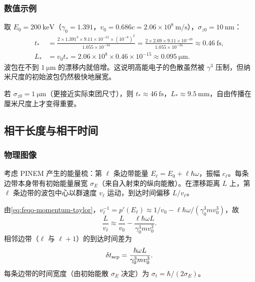 \subsubsection{数值示例}

取 $E_0=200\ \si{\kilo\electronvolt}$（$\gamma_0=1.391$，$v_0=0.686c=2.06\times10^8\ \si{\metre\per\second}$），$\sigma_{z0}=10\ \si{\nano\metre}$：
\begin{align}
t_*&=\frac{2\times1.391^3\times9.11\times10^{-31}\times(10^{-8})^2}{1.055\times10^{-34}}
=\frac{2\times2.69\times9.11\times10^{-49}}{1.055\times10^{-34}}
\approx 0.46\ \si{\femto\second},\\
L_*&=v_0 t_*=2.06\times10^8\times0.46\times10^{-15}\approx 0.095\ \si{\micro\metre}.
\end{align}
波包在不到 $1\ \si{\micro\metre}$ 的漂移内就倍增。这说明高能电子的色散虽然被 $\gamma^3$ 压制，但纳米尺度的初始波包仍然极快地展宽。

若 $\sigma_{z0}=1\ \si{\micro\metre}$（更接近实际束团尺寸），则 $t_*\approx 46\ \si{\femto\second}$，$L_*\approx 9.5\ \si{\milli\metre}$，自由传播在厘米尺度上才变得重要。

\subsection{相干长度与相干时间}

\subsubsection{物理图像}

考虑 PINEM 产生的能量梳：第 $\ell$ 条边带能量 $E_\ell=E_0+\ell\hbar\omega$，振幅 $c_\ell$。每条边带本身带有初始能量展宽 $\sigma_E$（来自入射束的纵向能散）。在漂移距离 $L$ 上，第 $\ell$ 条边带的波包中心以群速度 $v_\ell$ 运动，到达时间偏移 $L/v_\ell$。

由\cref{eq:feqo-momentum-taylor}，$v_\ell^{-1}=p'(E_\ell)\approx 1/v_0-\ell\hbar\omega/(\gamma_0^3mv_0^3)$，故
\begin{equation}
\frac{L}{v_\ell}\approx\frac{L}{v_0}-\frac{\ell\hbar\omega L}{\gamma_0^3mv_0^3}.
\label{eq:feqo-arrival-time-shift}
\end{equation}
相邻边带（$\ell$ 与 $\ell+1$）的到达时间差为
\begin{equation}
\delta t_{\rm sep}=\frac{\hbar\omega L}{\gamma_0^3mv_0^3}.
\label{eq:feqo-sideband-separation}
\end{equation}
每条边带的时间宽度（由初始能散 $\sigma_E$ 决定）为 $\sigma_t=\hbar/(2\sigma_E)$。

